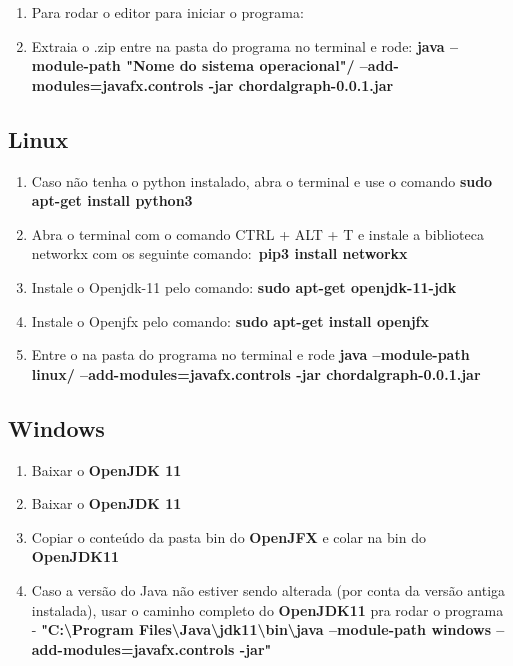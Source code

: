\documentclass[a4paper, 11pt]{article}
\begin{document}
			\begin{enumerate}
				\item Para rodar o editor para iniciar o programa:
				\item Extraia o .zip entre na pasta do programa no terminal e rode:
				\textbf{java --module-path "Nome do sistema operacional"/ --add-modules=javafx.controls -jar chordalgraph-0.0.1.jar}
			\end{enumerate}
			
			
			\subsection{Linux}
				\begin{enumerate}
					
					\item Caso não tenha o python instalado, abra o terminal e use o comando \textbf{sudo apt-get install python3}
					
					\item Abra o terminal com o comando CTRL + ALT + T e instale a biblioteca networkx com os seguinte comando:\ \textbf{pip3 install networkx}
					\item Instale o Openjdk-11 pelo comando:
					\textbf{sudo apt-get openjdk-11-jdk}
					\item Instale o Openjfx pelo comando:
					\textbf{sudo apt-get install openjfx}
					\item Entre o na pasta do programa no terminal e rode \textbf{java --module-path linux/ --add-modules=javafx.controls -jar chordalgraph-0.0.1.jar}
					
				\end{enumerate}
			\subsection{Windows}
			\begin{enumerate}
				\item Baixar o \textbf{OpenJDK 11}
				\item Baixar o \textbf{OpenJDK 11}
				\item Copiar o conteúdo da pasta bin do \textbf{OpenJFX} e colar na bin do \textbf{OpenJDK11}
				\item Caso a versão do Java não estiver sendo alterada (por conta da versão antiga instalada), usar o caminho completo do \textbf{OpenJDK11} pra rodar o programa 
				- \textbf{"C:\textbackslash Program Files\textbackslash Java\textbackslash jdk11\textbackslash bin\textbackslash java --module-path windows --add-modules=javafx.controls -jar"}
			\end{enumerate}
\end{document}
